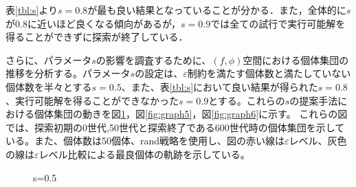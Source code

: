 \documentclass[a4paper,12pt]{jsreport}
\begin{document}
表\ref{tbl:s}より$s=0.8$が最も良い結果となっていることが分かる．また，全体的に$s$が0.8に近いほど良くなる傾向があるが，$s=0.9$では全ての試行で実行可能解を得ることができずに探索が終了している．


さらに、パラメータ$s$の影響を調査するために、$(f,\phi)$空間における個体集団の推移を分析する。パラメータ$s$の設定は、$\varepsilon$制約を満たす個体数と満たしていない個体数を半々とする$s=0.5$、また、表\ref{tbl:s}において良い結果が得られた$s=0.8$、実行可能解を得ることができなかった$s=0.9$とする。これらの$s$の提案手法における個体集団の動きを図\ref{fig:graph4}，図\ref{fig:graph5}，図\ref{fig:graph6}に示す。
これらの図では、探索初期の0世代,50世代と探索終了である600世代時の個体集団を示している。また、個体数は50個体、rand戦略を使用し、図の赤い線は$\varepsilon$レベル、灰色の線は$\varepsilon$レベル比較による最良個体の軌跡を示している。

\begin{figure}[htbp]
  \begin{center}
  \hfill
  \hfill
  \end{center}

  \caption{s=0.5}
  \label{fig:graph4}
\end{figure}
\end{document}

